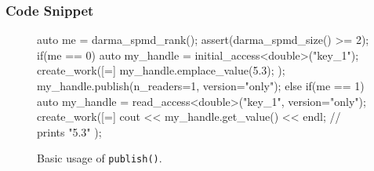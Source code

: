 \begin{subs}
\subsubsection{Code Snippet} 
\begin{figure}[!h]
\begin{CppCodeNumb}
auto me = darma_spmd_rank();
assert(darma_spmd_size() >= 2);
if(me == 0) {
  auto my_handle = initial_access<double>("key_1");
  create_work([=]{
    my_handle.emplace_value(5.3);
  });
  my_handle.publish(n_readers=1, version="only");
}
else if(me == 1) {
  auto my_handle = read_access<double>("key_1", version="only");
  create_work([=]{
    cout << my_handle.get_value() << endl; // prints "5.3"
  });
}
\end{CppCodeNumb}
\label{fig:fe_api_initialaccess}
\caption{Basic usage of \texttt{publish()}.}
\end{figure}


\end{subs}
